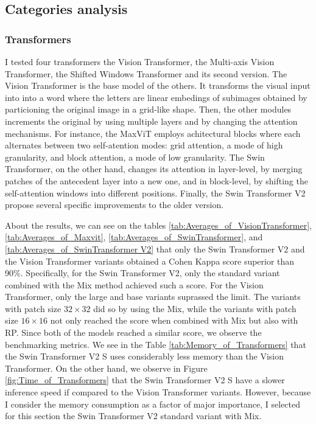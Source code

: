 \subsection{Categories analysis}

\subsubsection{Transformers}

I tested four transformers the Vision Transformer, the Multi-axis Vision Transformer, the Shifted Windows Transformer and its second version. The Vision Transformer is the base model of the others. It transforms the visual input into into a word where the letters are linear embedings of subimages obtained by particioning the original image in a grid-like shape. Then, the other modules increments the original by using multiple layers and by changing the attention mechanisms. For instance, the MaxViT employs achitectural blocks where each alternates between two self-atention modes: grid attention, a mode of high granularity, and block attention, a mode of low granularity. The Swin Transformer, on the other hand, changes its attention in layer-level, by merging patches of the antecedent layer into a new one, and in block-level, by shifting the self-attention windows into different positions. Finally, the Swin Transformer V2 propose several specific improvements to the older version.

About the results, we can see on the tables \ref{tab:Averages_of_VisionTransformer}, \ref{tab:Averages_of_Maxvit}, \ref{tab:Averages_of_SwinTransformer}, and \ref{tab:Averages_of_SwinTransformer V2} that only the Swin Transformer V2 and the Vision Transformer variants obtained a Cohen Kappa score superior than 90\%. Specifically, for the Swin Transformer V2, only the standard variant combined with the \acrshort{Mix} method achieved such a score. For the Vision Transformer, only the large and base variants suprassed the limit. The variants with patch size $32\times 32$ did so by using the \acrshort{Mix}, while the variants with patch size $16 \times 16$ not only reached the score when combined with \acrshort{Mix} but also with \acrshort{RP}. Since both of the models reached a similar score, we observe the benchmarking metrics. We see in the Table \ref{tab:Memory_of_Transformers} that the Swin Transformer V2 S uses considerably less memory than the Vision Transformer. On the other hand, we observe in Figure \ref{fig:Time_of_Transformers} that the Swin Transformer V2 S have a slower inference speed if compared to the Vision Transformer variants. However, because I consider the memory consumption as a factor of major importance, I selected for this section the Swin Transformer V2 standard variant with \acrshort{Mix}.

